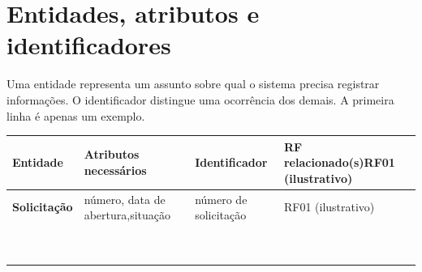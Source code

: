 \section{Entidades, atributos e identificadores}

Uma entidade representa um assunto sobre qual o sistema precisa registrar
informações. O identificador distingue uma ocorrência dos demais.
A primeira linha é apenas um exemplo.

\begin{table}[h]
\centering
\small
\setlength{\tabcolsep}{4pt}
\renewcommand{\arraystretch}{1.8}
\begin{tabularx}{\linewidth}{|>{\raggedright\arraybackslash}X
                              |>{\raggedright\arraybackslash}X
                              |>{\raggedright\arraybackslash}X
                              |>{\centering\arraybackslash}X|}
\hline
\textbf{Entidade} &
\textbf{Atributos necessários} &
\textbf{Identificador} &
\textbf{RF relacionado(s)\newline{}RF01 (ilustrativo)} \\
\hline
\textbf{Solicitação} &
\raggedright número, data de abertura,\newline situação &
\raggedright número de solicitação &
RF01 (ilustrativo) \\
\hline
 & & & \\
\hline
 & & & \\
\hline
 & & & \\
\hline
 & & & \\
\hline
 & & & \\
\hline
 & & & \\
\hline
 & & & \\
\hline
 & & & \\
\hline
 & & & \\
\hline
\end{tabularx}
\end{table}
